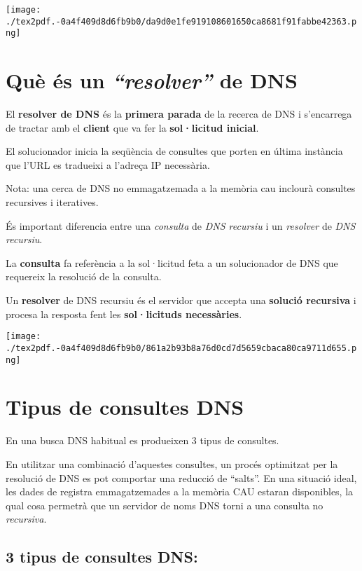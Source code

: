 \documentclass[]{article}
\begin{document}
\texttt{[image: ./tex2pdf.-0a4f409d8d6fb9b0/da9d0e1fe919108601650ca8681f91fabbe42363.png]}

\hypertarget{quuxe8-uxe9s-un-resolver-de-dns}{%
\section{\texorpdfstring{\textbf{Què és un \emph{``resolver''} de
DNS}}{Què és un ``resolver'' de DNS}}\label{quuxe8-uxe9s-un-resolver-de-dns}}

El \textbf{resolver de DNS} és la \textbf{primera parada} de la recerca
de DNS i s'encarrega de tractar amb el \textbf{client} que va fer la
\textbf{sol·licitud inicial}.

El solucionador inicia la seqüència de consultes que porten en última
instància que l'URL es tradueixi a l'adreça IP necessària.

Nota: una cerca de DNS no emmagatzemada a la memòria cau inclourà
consultes recursives i iteratives.

És important diferencia entre una \emph{consulta} de \emph{DNS recursiu}
i un \emph{resolver} de \emph{DNS recursiu}.

La \textbf{consulta} fa referència a la sol·licitud feta a un
solucionador de DNS que requereix la resolució de la consulta.

Un \textbf{resolver} de DNS recursiu és el servidor que accepta una
\textbf{solució recursiva} i procesa la resposta fent les
\textbf{sol·licituds necessàries}.

\texttt{[image: ./tex2pdf.-0a4f409d8d6fb9b0/861a2b93b8a76d0cd7d5659cbaca80ca9711d655.png]}

\hypertarget{tipus-de-consultes-dns}{%
\section{\texorpdfstring{\textbf{Tipus de consultes
DNS}}{Tipus de consultes DNS}}\label{tipus-de-consultes-dns}}

En una busca DNS habitual es produeixen 3 tipus de consultes.

En utilitzar una combinació d'aquestes consultes, un procés optimitzat
per la resolució de DNS es pot comportar una reducció de ``salts''. En
una situació ideal, les dades de registra emmagatzemades a la memòria
CAU estaran disponibles, la qual cosa permetrà que un servidor de noms
DNS torni a una consulta no \emph{recursiva}.

\hypertarget{tipus-de-consultes-dns-1}{%
\subsection{\texorpdfstring{\textbf{3 tipus de consultes
DNS:}}{3 tipus de consultes DNS:}}\label{tipus-de-consultes-dns-1}}
\end{document}
